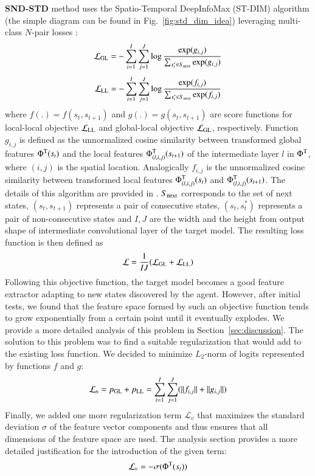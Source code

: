\documentclass[a4paper,11pt]{elsarticle}
\begin{document}
\textbf{SND-STD} method uses the Spatio-Temporal DeepInfoMax (ST-DIM) algorithm \citep{Anand2019} (the simple diagram can be found in Fig.~\ref{fig:std_dim_idea}) leveraging multi-class $N$-pair losses \citep{Sohn2016}: 
\begin{equation}
\label{eq:sndstd1}
\mathcal{L}_{\rm GL} = - \sum_{i=1}^{I} \sum_{j=1}^{J} \log \frac{ \exp (g_{i,j})} { \sum_{s_{t}^{*} \in S_{\rm next}} \exp (g_{i,j})}
\end{equation}
\begin{equation}
\label{eq:sndstd2}
\mathcal{L}_{\rm LL} = -  \sum_{i=1}^{I} \sum_{j=1}^{J} \log \frac{ \exp (f_{i,j})} { \sum_{s_{t}^{*} \in S_{\rm next}} \exp (f_{i,j})}
\end{equation}
where $f(.) = f(s_t, s_{t+1})$ and $g(.) = g(s_t, s_{t+1})$
are score functions for local-local objective $\mathcal{L}_{\rm LL}$ and global-local objective $\mathcal{L}_{\rm GL}$, respectively. 
Function $g_{i,j}$ is defined as the unnormalized cosine similarity between transformed global features $\Phi^{\rm T}(s_t)$ and the local features $\Phi^{\rm T}_{(l,i,j)}(s_{t+1})$ of the intermediate layer $l$ in $\Phi^{\rm T}$, where $(i,j)$ is the spatial location. Analogically $f_{i,j}$ is the unnormalized cosine similarity between transformed local features $\Phi^{\rm T}_{(l,i,j)}(s_t)$ and $\Phi^{\rm T}_{(l,i,j)}(s_{t+1})$. The details of this algorithm are provided in \cite{Anand2019}. $S_{\rm next}$ corresponds to the set of next states, $(s_t, s_{t+1})$ represents a pair of consecutive states, $(s_t, s_{t}^{*})$ represents a pair of non-consecutive states and $I,J$ are the width and the height from output shape of intermediate convolutional layer of the target model.
The resulting loss function is then defined as
\begin{equation}
\label{eq:sndstd3}
\mathcal{L} = \frac{1}{IJ} (\mathcal{L}_{\rm GL} + \mathcal{L}_{\rm LL})
\end{equation}
Following this objective function, the target model becomes a good feature extractor adapting to new states discovered by the agent. However, after initial tests, we found that the feature space formed by such an objective function tends to grow exponentially from a certain point until it eventually explodes. We provide a more detailed analysis of this problem in Section~\ref{sec:discussion}. The solution to this problem was to find a suitable regularization that would add to the existing loss function. We decided to minimize $L_2$-norm of logits represented by functions $f$ and $g$:
\begin{equation}
\label{eq:sndstd4}
\mathcal{L}_{n} = p_{\rm GL} + p_{\rm LL} = 
\sum_{i=1}^{I} \sum_{j=1}^J (\| f_{i,j} \| + \| g_{i,j} \|)
\end{equation}
Finally, we added one more regularization term $\mathcal{L}_v$ that maximizes the standard deviation $\sigma$ of the feature vector components and thus ensures that all dimensions of the feature space are used. The analysis section provides a more detailed justification for the introduction of the given term:
\begin{equation}
\label{eq:sndstd5}
\mathcal{L}_{v} = -\sigma(\Phi^{\rm T}(s_t))
\end{equation}
\end{document}

